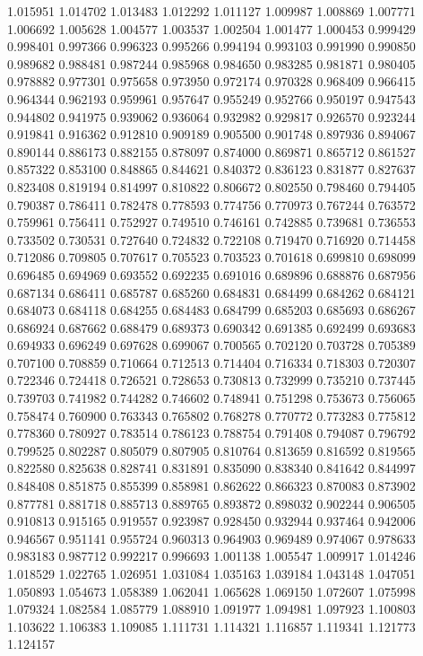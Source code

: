 1.015951
1.014702
1.013483
1.012292
1.011127
1.009987
1.008869
1.007771
1.006692
1.005628
1.004577
1.003537
1.002504
1.001477
1.000453
0.999429
0.998401
0.997366
0.996323
0.995266
0.994194
0.993103
0.991990
0.990850
0.989682
0.988481
0.987244
0.985968
0.984650
0.983285
0.981871
0.980405
0.978882
0.977301
0.975658
0.973950
0.972174
0.970328
0.968409
0.966415
0.964344
0.962193
0.959961
0.957647
0.955249
0.952766
0.950197
0.947543
0.944802
0.941975
0.939062
0.936064
0.932982
0.929817
0.926570
0.923244
0.919841
0.916362
0.912810
0.909189
0.905500
0.901748
0.897936
0.894067
0.890144
0.886173
0.882155
0.878097
0.874000
0.869871
0.865712
0.861527
0.857322
0.853100
0.848865
0.844621
0.840372
0.836123
0.831877
0.827637
0.823408
0.819194
0.814997
0.810822
0.806672
0.802550
0.798460
0.794405
0.790387
0.786411
0.782478
0.778593
0.774756
0.770973
0.767244
0.763572
0.759961
0.756411
0.752927
0.749510
0.746161
0.742885
0.739681
0.736553
0.733502
0.730531
0.727640
0.724832
0.722108
0.719470
0.716920
0.714458
0.712086
0.709805
0.707617
0.705523
0.703523
0.701618
0.699810
0.698099
0.696485
0.694969
0.693552
0.692235
0.691016
0.689896
0.688876
0.687956
0.687134
0.686411
0.685787
0.685260
0.684831
0.684499
0.684262
0.684121
0.684073
0.684118
0.684255
0.684483
0.684799
0.685203
0.685693
0.686267
0.686924
0.687662
0.688479
0.689373
0.690342
0.691385
0.692499
0.693683
0.694933
0.696249
0.697628
0.699067
0.700565
0.702120
0.703728
0.705389
0.707100
0.708859
0.710664
0.712513
0.714404
0.716334
0.718303
0.720307
0.722346
0.724418
0.726521
0.728653
0.730813
0.732999
0.735210
0.737445
0.739703
0.741982
0.744282
0.746602
0.748941
0.751298
0.753673
0.756065
0.758474
0.760900
0.763343
0.765802
0.768278
0.770772
0.773283
0.775812
0.778360
0.780927
0.783514
0.786123
0.788754
0.791408
0.794087
0.796792
0.799525
0.802287
0.805079
0.807905
0.810764
0.813659
0.816592
0.819565
0.822580
0.825638
0.828741
0.831891
0.835090
0.838340
0.841642
0.844997
0.848408
0.851875
0.855399
0.858981
0.862622
0.866323
0.870083
0.873902
0.877781
0.881718
0.885713
0.889765
0.893872
0.898032
0.902244
0.906505
0.910813
0.915165
0.919557
0.923987
0.928450
0.932944
0.937464
0.942006
0.946567
0.951141
0.955724
0.960313
0.964903
0.969489
0.974067
0.978633
0.983183
0.987712
0.992217
0.996693
1.001138
1.005547
1.009917
1.014246
1.018529
1.022765
1.026951
1.031084
1.035163
1.039184
1.043148
1.047051
1.050893
1.054673
1.058389
1.062041
1.065628
1.069150
1.072607
1.075998
1.079324
1.082584
1.085779
1.088910
1.091977
1.094981
1.097923
1.100803
1.103622
1.106383
1.109085
1.111731
1.114321
1.116857
1.119341
1.121773
1.124157
